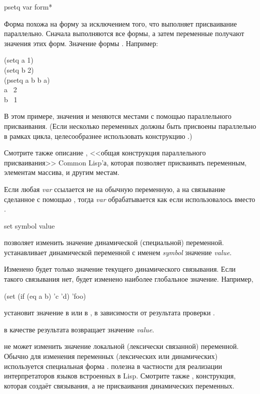\begin{defmac}
psetq {var form}*

Форма  похожа на форму  за исключением того, что выполняет
присваивание параллельно. Сначала выполняются все формы, а затем переменные
получают значения этих форм. Значение формы  {\false}.
Например:
\begin{lisp}
(setq a 1) \\
(setq b 2) \\
(psetq a b  b a) \\
a \EV\ 2 \\
b \EV\ 1
\end{lisp}
В этом примере, значения  и  меняются местами с помощью
параллельного присваивания.
(Если несколько переменных должны быть присвоены параллельно в рамках цикла,
целесообразнее использовать конструкцию .)

Смотрите также описание , <<общая конструкция параллельного
присваивания>> Common Lisp'а, которая позволяет присваивать переменным,
элементам массива, и другим местам.

Если любая \emph{var} ссылается не на обычную переменную, а на связывание
сделанное с помощью , тогда \emph{var} обрабатывается как
если  использовалось вместо .
\end{defmac}

\begin{defun}[Функция]
set symbol value

 позволяет изменить значение динамической (специальной) переменной.
 устанавливает динамической переменной с именем \emph{symbol} значение
\emph{value}.

Изменено будет только значение текущего динамического связывания. Если такого
связывания нет, будет изменено наиболее глобальное значение.
Например,
\begin{lisp}
(set (if (eq a b) 'c 'd) 'foo)
\end{lisp}
установит значение  в  или  в , в зависимости от
результата проверки .

 в качестве результата возвращает значение \emph{value}.

 не может изменить значение локальной (лексически связанной)
переменной.
Обычно для изменения переменных (лексических или динамических) используется
специальная форма .
 полезна в частности для реализации интерпретаторов языков встроенных в
Lisp.
Смотрите также , конструкция, которая создаёт связывания, а не
присваивания динамических переменных.
\end{defun}

